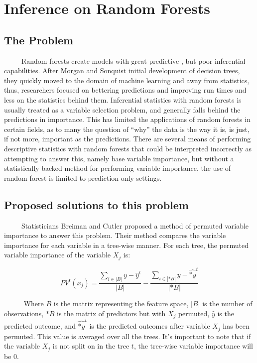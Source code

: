 \documentclass[12pt,twoside]{reedthesis}
\begin{document}
  \section{Inference on Random Forests}\label{inference-on-random-forests}
  
  \subsection{The Problem}\label{the-problem}
  
  ~~~~~Random forests create models with great predictive-, but poor
  inferential capabilities. After Morgan and Sonquist initial development
  of decision trees, they quickly moved to the domain of machine learning
  and away from statistics, thus, researchers focused on bettering
  predictions and improving run times and less on the statistics behind
  them. Inferential statistics with random forests is usually treated as a
  variable selection problem, and generally falls behind the predictions
  in importance. This has limited the applications of random forests in
  certain fields, as to many the question of ``why'' the data is the way
  it is, is just, if not more, important as the predictions. There are
  several means of performing descriptive statistics with random forests
  that could be interpreted incorrectly as attempting to answer this,
  namely base variable importance, but without a statistically backed
  method for performing variable importance, the use of random forest is
  limited to prediction-only settings.
  
  \subsection{Proposed solutions to this
  problem}\label{proposed-solutions-to-this-problem}
  
  ~~~~~Statisticians Breiman and Cutler proposed a method of permuted
  variable importance to answer this problem. Their method compares the
  variable importance for each variable in a tree-wise manner. For each
  tree, the permuted variable importance of the variable \(X_j\) is:
  
  \[PV^t(x_j) = \frac{\sum_{i \in |B|} {y} - \hat{y}^t}{|B|} - \frac{\sum_{i \in |*B|} {y} - \hat{*y}^t}{|*B|} \]
  
  ~~~~~ Where \(B\) is the matrix representing the feature space, \(|B|\)
  is the number of observations, \(*B\) is the matrix of predictors but
  with \(X_j\) permuted, \(\hat{y}\) is the predicted outcome, and
  \(\hat{*y}^t\) is the predicted outcomes after variable \(X_j\) has been
  permuted. This value is averaged over all the trees. It's important to
  note that if the variable \(X_j\) is not split on in the tree \(t\), the
  tree-wise variable importance will be 0.
  
\end{document}
